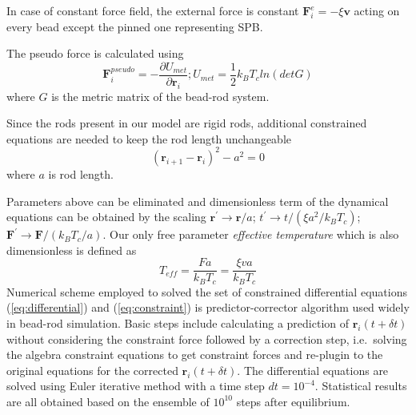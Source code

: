 \documentclass{article}
\begin{document}
In case of constant force field, the external force is constant $\mathbf{F}_i^e = -\xi \mathbf{v}$ acting on every bead except the pinned one representing SPB. 

The pseudo force is calculated using
\begin{equation}
	\mathbf{F}_i^{pseudo} = -\frac{\partial U_{met}}{\partial\mathbf{r}_i}; U_{met} = \frac{1}{2}k_B T_c ln(det G)
\end{equation}
where $G$ is the metric matrix of the bead-rod system\cite{Pasquali2002}.

Since the rods present in our model are rigid rods, additional constrained equations are needed to keep the rod length unchangeable
\begin{equation}
	\label{eq:constraint}
	(\mathbf{r}_{i+1} - \mathbf{r}_{i})^2 - a^2 = 0
\end{equation}
where $a$ is rod length.

Parameters above can be eliminated and dimensionless term of the dynamical equations can be obtained by the scaling $\mathbf{r}^{\prime}\to \mathbf{r}/a$; $t^{\prime}\to t/(\xi a^2/k_BT_c)$; $\mathbf{F}^{\prime}\to\mathbf{F}/(k_BT_c/a)$.
Our only free parameter \emph{effective temperature} which is also dimensionless is defined as
\begin{equation}
	T_{eff} = \frac{Fa}{k_BT_c} = \frac{\xi v a}{k_B T_c}
\end{equation}
Numerical scheme employed to solved the set of constrained differential equations (\ref{eq:differential}) and (\ref{eq:constraint}) is predictor-corrector algorithm used widely in bead-rod simulation\cite{Cruz2012,Somasi2002,Liu1989}.
Basic steps include calculating a prediction of $\mathbf{r}_i(t+\delta t)$ without considering the constraint force followed by a correction step, i.e.\ solving the algebra constraint equations to get constraint forces and re-plugin to the original equations for the corrected $\mathbf{r}_i(t+\delta t)$.
The differential equations are solved using Euler iterative method with a time step $dt = 10^{-4}$.  Statistical results are all obtained based on the ensemble of $10^{10}$ steps after equilibrium.  

% 
% 
	
\end{document}
